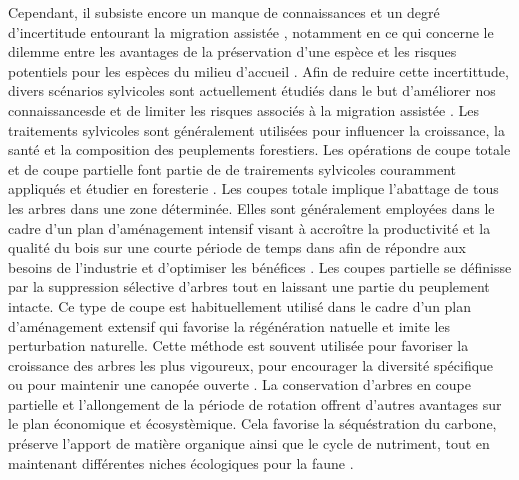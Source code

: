 Cependant, il subsiste encore un manque de connaissances et un degré d'incertitude entourant la migration assistée \citep{Park2018Informationunderload,Klenk2015assistedmigration}, 
notamment en ce qui concerne le dilemme entre les avantages de la préservation d'une espèce et les risques potentiels pour les espèces du milieu d'accueil \citep{Hewitt2011Takingstock,McLachlan2007frameworkdebate,Vitt2010Assistedmigration}.
Afin de reduire cette incertittude, divers scénarios sylvicoles sont actuellement étudiés dans le but d'améliorer nos connaissancesde et de limiter les risques associés à la migration assistée \citep{royoDesiredREgenerationAssisted2023}.
Les traitements sylvicoles sont généralement utilisées pour influencer la croissance, la santé et la composition des peuplements forestiers.
Les opérations de coupe totale et de coupe partielle font partie de de trairements sylvicoles couramment appliqués et étudier en foresterie \citep{Ameray2021Forestcarbon,Chaudhary2016Impactforest,Man2008Elevenyearresponses,MontoroGirona2018ConiferRegeneration,PamerleauCouture2015Effectthree}. 
Les coupes totale implique l'abattage de tous les arbres dans une zone déterminée.
Elles sont généralement employées dans le cadre d'un plan d'aménagement intensif visant à accroître la productivité et la qualité du bois 
sur une courte période de temps dans afin de répondre aux besoins de l'industrie et d'optimiser les bénéfices \citep{Ameray2021Forestcarbon}.
Les coupes partielle se définisse par la suppression sélective d'arbres tout en laissant une partie du peuplement intacte. 
Ce type de coupe est habituellement utilisé dans le cadre d'un plan d'aménagement extensif qui favorise la régénération natuelle et imite les perturbation naturelle.
Cette méthode est souvent utilisée pour favoriser la croissance des arbres les plus vigoureux, pour encourager la diversité spécifique ou pour maintenir une canopée ouverte \citep{Ameray2021Forestcarbon,Irland2011Timberproductivity}.
La conservation d'arbres  en coupe partielle et l'allongement de la période de rotation offrent d'autres avantages sur le plan économique et écosystèmique. 
Cela favorise la séquéstration du carbone, préserve l'apport de matière organique ainsi que le cycle de nutriment, 
tout en maintenant différentes niches écologiques pour la faune \citep{Ameray2021Forestcarbon,Barg1999Influencepartial,Tong2020Forestmanagement}.

